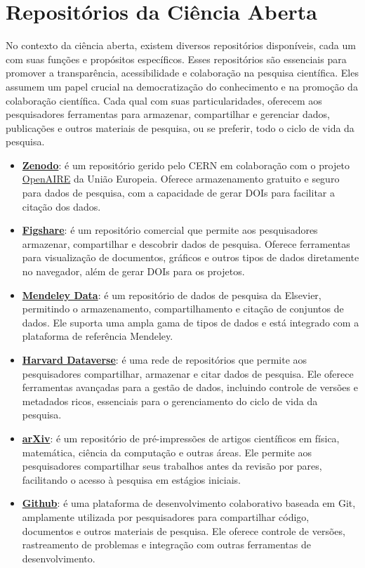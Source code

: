 \documentclass[
  a4paper,
]{article}
\providecommand{\tightlist}{%
  \setlength{\itemsep}{0pt}\setlength{\parskip}{0pt}}\usepackage{longtable,booktabs,array}
\begin{document}

\section{Repositórios da Ciência Aberta}\label{sec-osf}

No contexto da ciência aberta, existem diversos repositórios
disponíveis, cada um com suas funções e propósitos específicos. Esses
repositórios são essenciais para promover a transparência,
acessibilidade e colaboração na pesquisa científica. Eles assumem um
papel crucial na democratização do conhecimento e na promoção da
colaboração científica. Cada qual com suas particularidades, oferecem
aos pesquisadores ferramentas para armazenar, compartilhar e gerenciar
dados, publicações e outros materiais de pesquisa, ou se preferir, todo
o ciclo de vida da pesquisa.

\begin{itemize}
\tightlist
\item
  \href{https://www.zenodo.org}{\textbf{Zenodo}}: é um repositório
  gerido pelo CERN em colaboração com o projeto
  \href{https://www.openaire.eu/}{OpenAIRE} da União Europeia. Oferece
  armazenamento gratuito e seguro para dados de pesquisa, com a
  capacidade de gerar DOIs para facilitar a citação dos dados.
\item
  \href{https://www.figshare.com}{\textbf{Figshare}}: é um repositório
  comercial que permite aos pesquisadores armazenar, compartilhar e
  descobrir dados de pesquisa. Oferece ferramentas para visualização de
  documentos, gráficos e outros tipos de dados diretamente no navegador,
  além de gerar DOIs para os projetos.
\item
  \href{https://data.mendeley.com}{\textbf{Mendeley Data}}: é um
  repositório de dados de pesquisa da Elsevier, permitindo o
  armazenamento, compartilhamento e citação de conjuntos de dados. Ele
  suporta uma ampla gama de tipos de dados e está integrado com a
  plataforma de referência Mendeley.
\item
  \href{https://dataverse.harvard.edu}{\textbf{Harvard Dataverse}}: é
  uma rede de repositórios que permite aos pesquisadores compartilhar,
  armazenar e citar dados de pesquisa. Ele oferece ferramentas avançadas
  para a gestão de dados, incluindo controle de versões e metadados
  ricos, essenciais para o gerenciamento do ciclo de vida da pesquisa.
\item
  \href{https://arxiv.org}{\textbf{arXiv}}: é um repositório de
  pré-impressões de artigos científicos em física, matemática, ciência
  da computação e outras áreas. Ele permite aos pesquisadores
  compartilhar seus trabalhos antes da revisão por pares, facilitando o
  acesso à pesquisa em estágios iniciais.
\item
  \href{https://github.com}{\textbf{Github}}: é uma plataforma de
  desenvolvimento colaborativo baseada em Git, amplamente utilizada por
  pesquisadores para compartilhar código, documentos e outros materiais
  de pesquisa. Ele oferece controle de versões, rastreamento de
  problemas e integração com outras ferramentas de desenvolvimento.
\end{itemize}
\end{document}
